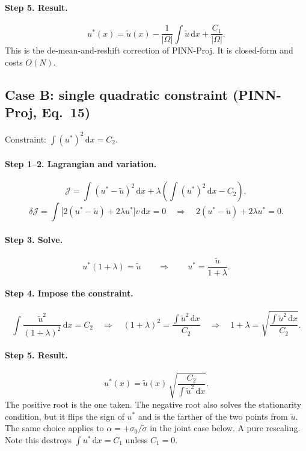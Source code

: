 \documentclass[11pt,a4paper]{article}
\theoremstyle{remark}
\newcommand{\dx}{\,\mathrm{d}x}
\newcommand{\ut}{\tilde{u}}
\newcommand{\us}{u^{*}}
\newcommand{\Om}{\Omega}
\begin{document}
\paragraph{Step 5. Result.}
\begin{equation}
\boxed{\ \us(x) = \ut(x) - \frac{1}{|\Om|}\int \ut \dx + \frac{C_1}{|\Om|}. \ }
\label{eq:proj-linear}
\end{equation}
This is the de-mean-and-reshift correction of PINN-Proj. It is closed-form and
costs $O(N)$.

\subsection{Case B: single quadratic constraint (PINN-Proj, Eq.~15)}

Constraint: $\displaystyle\int (\us)^2 \dx = C_2$.

\paragraph{Step 1--2. Lagrangian and variation.}
\begin{equation}
\mathcal{J} = \int(\us-\ut)^2\dx + \lambda\left(\int(\us)^2\dx - C_2\right),
\end{equation}
\begin{equation}
\delta\mathcal{J} = \int\Big[2(\us-\ut) + 2\lambda \us\Big]v\dx = 0
\quad\Longrightarrow\quad
2(\us-\ut) + 2\lambda\us = 0 .
\end{equation}

\paragraph{Step 3. Solve.}
\begin{equation}
\us(1+\lambda) = \ut
\qquad\Longrightarrow\qquad
\us = \frac{\ut}{1+\lambda}.
\end{equation}

\paragraph{Step 4. Impose the constraint.}
\begin{equation}
\int \frac{\ut^2}{(1+\lambda)^2}\dx = C_2
\quad\Longrightarrow\quad
(1+\lambda)^2 = \frac{\int \ut^2\dx}{C_2}
\quad\Longrightarrow\quad
1+\lambda = \sqrt{\frac{\int\ut^2\dx}{C_2}} .
\end{equation}

\paragraph{Step 5. Result.}
\begin{equation}
\boxed{\ \us(x) = \ut(x)\,\sqrt{\frac{C_2}{\int \ut^2 \dx}}. \ }
\label{eq:proj-quad}
\end{equation}
The positive root is the one taken. The negative root also solves the
stationarity condition, but it flips the sign of $\us$ and is the farther of
the two points from $\ut$. The same choice applies to
$\alpha = +\sigma_0/\tilde\sigma$ in the joint case below.
A pure rescaling. Note this destroys $\int\us\dx = C_1$ unless $C_1 = 0$.
\end{document}
